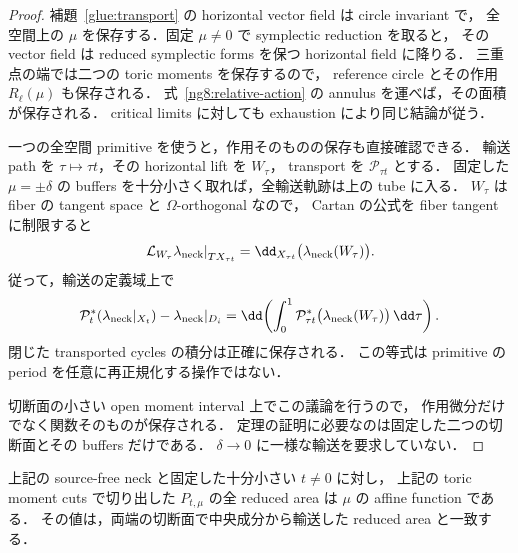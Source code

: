 \begin{proof}
補題~\ref{glue:transport} の horizontal vector field は circle invariant で，
全空間上の $\mu$ を保存する．固定 $\mu\ne0$ で symplectic reduction を取ると，
その vector field は reduced symplectic forms を保つ horizontal field に降りる．
三重点の端では二つの toric moments を保存するので，
reference circle とその作用 $R_\ell(\mu)$ も保存される．
式~\eqref{ng8:relative-action} の annulus を運べば，その面積が保存される．
critical limits に対しても exhaustion により同じ結論が従う．

一つの全空間 primitive を使うと，作用そのものの保存も直接確認できる．
輸送 path を $\tau\mapsto\tau t$，その horizontal lift を $W_\tau$，
transport を $\mathcal P_{\tau t}$ とする．
固定した $\mu=\pm\delta$ の buffers を十分小さく取れば，全輸送軌跡は上の tube に入る．
$W_\tau$ は fiber の tangent space と $\Omega$-orthogonal なので，
Cartan の公式を fiber tangent に制限すると
\[
 \left.\mathcal L_{W_\tau}\lambda_{\rm neck}\right|_{TX_{\tau t}}
 =\dd_{X_{\tau t}}\bigl(\lambda_{\rm neck}(W_\tau)\bigr).
\]
従って，輸送の定義域上で
\begin{equation}\label{ng8:exact-transport}
 \mathcal P_t^*(\lambda_{\rm neck}|_{X_t})
   -\lambda_{\rm neck}|_{D_i}
 =\dd\!\left(\int_0^1
       \mathcal P_{\tau t}^*\bigl(\lambda_{\rm neck}(W_\tau)\bigr)
       \,\dd\tau\right).
\end{equation}
閉じた transported cycles の積分は正確に保存される．
この等式は primitive の period を任意に再正規化する操作ではない．

切断面の小さい open moment interval 上でこの議論を行うので，
作用微分だけでなく関数そのものが保存される．
定理の証明に必要なのは固定した二つの切断面とその buffers だけである．
$\delta\to0$ に一様な輸送を要求していない．
\end{proof}

\begin{lemma}
\label{ng8:relative-dh}
上記の source-free neck と固定した十分小さい $t\ne0$ に対し，
上記の toric moment cuts で切り出した $P_{t,\mu}$ の全 reduced area は
$\mu$ の affine function である．
その値は，両端の切断面で中央成分から輸送した reduced area と一致する．
\end{lemma}

